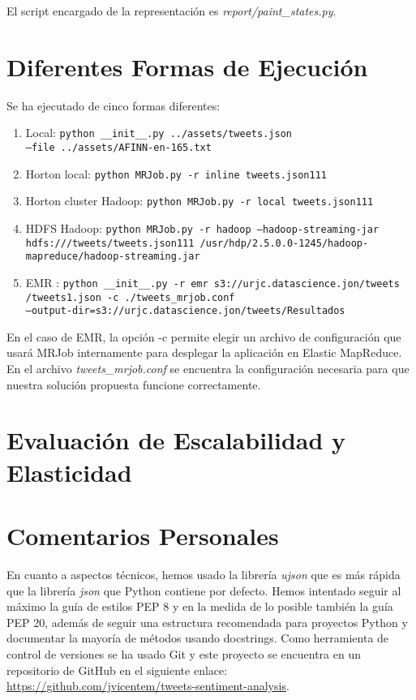 \documentclass[12pt,a4paper]{article}
\begin{document}
El script encargado de la representación es \textit{report/paint\_states.py}. 

\section{Diferentes Formas de Ejecución}

Se ha ejecutado de cinco formas diferentes:
\begin{enumerate}
\item Local: \texttt{python \_\_init\_\_.py ../assets/tweets.json \\--file ../assets/AFINN-en-165.txt}
\item Horton local: \texttt{python MRJob.py -r inline tweets.json111}
\item Horton cluster Hadoop: \texttt{python MRJob.py -r local tweets.json111}
\item HDFS Hadoop: \texttt{python MRJob.py -r hadoop --hadoop-streaming-jar \\ hdfs:///tweets/tweets.json111  /usr/hdp/2.5.0.0-1245/hadoop-\\mapreduce/hadoop-streaming.jar}
\item EMR : \texttt{python \_\_init\_\_.py -r emr s3://urjc.datascience.jon/tweets\\/tweets1.json -c ./tweets\_mrjob.conf \\--output-dir=s3://urjc.datascience.jon/tweets/Resultados}
\end{enumerate}

En el caso de EMR, la opción -c permite elegir un archivo de configuración que usará MRJob internamente para desplegar la aplicación en Elastic MapReduce. En el archivo \textit{tweets\_mrjob.conf} se encuentra la configuración necesaria para que nuestra solución propuesta funcione correctamente.

\section{Evaluación de Escalabilidad y Elasticidad}

\section{Comentarios Personales}

En cuanto a aspectos técnicos, hemos usado la librería \textit{ujson} que es más rápida que la librería \textit{json} que Python contiene por defecto. Hemos intentado seguir al máximo la guía de estilos PEP 8 y en la medida de lo posible también la guía PEP 20, además de seguir una estructura recomendada para proyectos Python y documentar la mayoría de métodos usando docstrings.
Como herramienta de control de versiones se ha usado Git y este proyecto se encuentra en un repositorio de GitHub en el siguiente enlace: \url{https://github.com/jvicentem/tweets-sentiment-analysis}.
\end{document}
